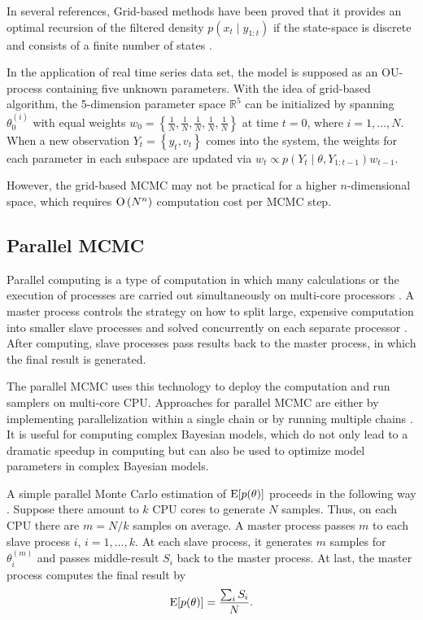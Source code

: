 In several references, Grid-based methods have been proved that it provides an optimal recursion of the filtered density $p(x_t\mid y_{1:t})$ if the state-space is discrete and consists of a finite number of states \citep{ristic2004beyond, stroud2018bayesian, arulampalam2002tutorial, hartmann2016grid}. 

In the application of real time series data set, the model is supposed as an OU-process containing five unknown parameters. With the idea of grid-based algorithm, the 5-dimension parameter space $\mathbb{R}^5$ can be initialized by spanning $\theta_0^{(i)}$ with equal weights $w_0=\left\lbrace\frac{1}{N},\frac{1}{N},\frac{1}{N},\frac{1}{N},\frac{1}{N}\right\rbrace$ at time $t=0$, where $i=1,\ldots,N$. When a new observation $Y_t=\left\lbrace y_t,v_t\right\rbrace$ comes into the system, the weights for each parameter in each subspace are updated via $w_t\propto p(Y_t\mid \theta,Y_{1:t-1})w_{t-1}$. 

However, the grid-based MCMC may not be practical for a higher $n$-dimensional space, which requires ${\rm O}\left(N^n\right)$ computation cost per MCMC step. 


\subsection*{Parallel MCMC}

Parallel computing is a type of computation in which many calculations or the execution of processes are carried out simultaneously on multi-core processors \citep{asanovic2006landscape}. A master process controls the strategy on how to split large, expensive computation into smaller slave processes and solved concurrently on each separate processor \citep{Almasi1994Highly}. After computing, slave processes pass results back to the master process, in which the final result is generated. 

The parallel MCMC uses this technology to deploy the computation and run samplers on multi-core CPU. Approaches for parallel MCMC are either by implementing parallelization within a single chain or by running multiple chains \citep{wu2012parallel}. It is useful for computing complex Bayesian models, which do not only lead to a dramatic speedup in computing but can also be used to optimize model parameters in complex Bayesian models.

A simple parallel Monte Carlo estimation of $\mathrm{E}\lbrack p(\theta)\rbrack$ proceeds in the following way \citep{kontoghiorghes2005handbook}. Suppose there amount to $k$ CPU cores to generate $N$ samples. Thus, on each CPU there are $m=N/k$ samples on average. A master process passes $m$ to each slave process $i$, $i=1,\ldots,k$. At each slave process, it generates $m$ samples for $\theta_i^{(m)}$ and passes middle-result $S_i$ back to the master process. At last, the master process computes the final result by 
\begin{equation}
\mathrm{E}\lbrack p(\theta)\rbrack=\frac{\sum_i S_i}{N}. 
\end{equation}

